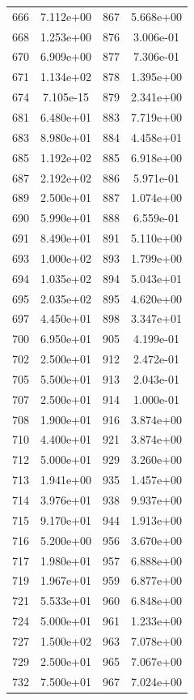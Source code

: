 \documentclass[12pt]{article}
\begin{document}
\begin{longtable}{@{}cccc@{}}
666 & 7.112e+00 & 867 & 5.668e+00 \\
668 & 1.253e+00 & 876 & 3.006e-01 \\
670 & 6.909e+00 & 877 & 7.306e-01 \\
671 & 1.134e+02 & 878 & 1.395e+00 \\
674 & 7.105e-15 & 879 & 2.341e+00 \\
681 & 6.480e+01 & 883 & 7.719e+00 \\
683 & 8.980e+01 & 884 & 4.458e+01 \\
685 & 1.192e+02 & 885 & 6.918e+00 \\
687 & 2.192e+02 & 886 & 5.971e-01 \\
689 & 2.500e+01 & 887 & 1.074e+00 \\
690 & 5.990e+01 & 888 & 6.559e-01 \\
691 & 8.490e+01 & 891 & 5.110e+00 \\
693 & 1.000e+02 & 893 & 1.799e+00 \\
694 & 1.035e+02 & 894 & 5.043e+01 \\
695 & 2.035e+02 & 895 & 4.620e+00 \\
697 & 4.450e+01 & 898 & 3.347e+01 \\
700 & 6.950e+01 & 905 & 4.199e-01 \\
702 & 2.500e+01 & 912 & 2.472e-01 \\
705 & 5.500e+01 & 913 & 2.043e-01 \\
707 & 2.500e+01 & 914 & 1.000e-01 \\
708 & 1.900e+01 & 916 & 3.874e+00 \\
710 & 4.400e+01 & 921 & 3.874e+00 \\
712 & 5.000e+01 & 929 & 3.260e+00 \\
713 & 1.941e+00 & 935 & 1.457e+00 \\
714 & 3.976e+01 & 938 & 9.937e+00 \\
715 & 9.170e+01 & 944 & 1.913e+00 \\
716 & 5.200e+00 & 956 & 3.670e+00 \\
717 & 1.980e+01 & 957 & 6.888e+00 \\
719 & 1.967e+01 & 959 & 6.877e+00 \\
721 & 5.533e+01 & 960 & 6.848e+00 \\
724 & 5.000e+01 & 961 & 1.233e+00 \\
727 & 1.500e+02 & 963 & 7.078e+00 \\
729 & 2.500e+01 & 965 & 7.067e+00 \\
732 & 7.500e+01 & 967 & 7.024e+00 \\

\end{longtable}
\end{document}
